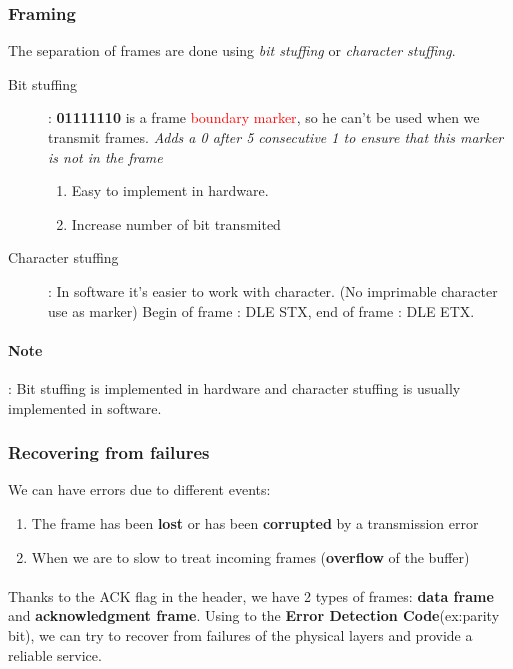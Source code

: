 \subsubsection{Framing}

The separation of frames are done using \emph{bit stuffing}
or \emph{character stuffing}.

\begin{description}
    \item[Bit stuffing] : \textbf{01111110} is a frame \textcolor{red}{boundary marker}, so he can't
    be used when we transmit frames.
    \textit{Adds a 0 after 5 consecutive 1 to ensure that this marker is not in the frame}
    \begin{enumerate}
      \item Easy to implement in hardware.
      \item Increase number of bit transmited
    \end{enumerate}
\item[Character stuffing] : In software it's easier to work with character. 
    (No imprimable character use as marker)
    Begin of frame : \textsc{DLE STX}, end of frame : \textsc{DLE ETX}.
\end{description}

\paragraph{Note} : Bit stuffing is implemented in hardware and character stuffing is usually
implemented in software.

\subsubsection{Recovering from failures}
We can have errors due to different events:
\begin{enumerate}
  \item The frame has been \textbf{lost} or has been \textbf{corrupted}
    by a transmission error
  \item When we are to slow to treat incoming frames (\textbf{overflow} of the buffer)
\end{enumerate}

\paragraph{ }
Thanks to the ACK flag in the header,
we have 2 types of frames: \textbf{data frame} and \textbf{acknowledgment frame}.
Using to the  \textbf{Error Detection Code}(ex:parity bit), we can try  to recover from failures
of the physical layers and provide a reliable service.

